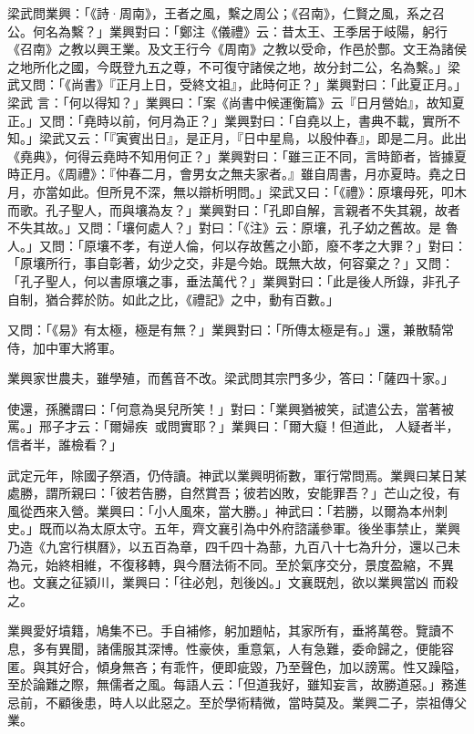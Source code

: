 \begin{pinyinscope}
 梁武問業興：「《詩·周南》，王者之風，繫之周公；《召南》，仁賢之風，系之召公。何名為繫？」業興對曰：「鄭注《儀禮》云：昔太王、王季居于岐陽，躬行《召南》之教以興王業。及文王行今《周南》之教以受命，作邑於酆。文王為諸侯之地所化之國，今既登九五之尊，不可復守諸侯之地，故分封二公，名為繫。」梁武又問：「《尚書》『正月上日，受終文祖』，此時何正？」業興對曰：「此夏正月。」梁武
 言：「何以得知？」業興曰：「案《尚書中候運衡篇》云『日月營始』，故知夏正。」又問：「堯時以前，何月為正？」業興對曰：「自堯以上，書典不載，實所不知。」梁武又云：「『寅賓出日』，是正月，『日中星鳥，以殷仲春』，即是二月。此出《堯典》，何得云堯時不知用何正？」業興對曰：「雖三正不同，言時節者，皆據夏時正月。《周禮》：『仲春二月，會男女之無夫家者。』雖自周書，月亦夏時。堯之日月，亦當如此。但所見不深，無以辯析明問。」梁武又曰：「《禮》：原壤母死，叩木而歌。孔子聖人，而與壤為友？」業興對曰：「孔即自解，言親者不失其親，故者不失其故。」又問：「壤何處人？」對曰：「《注》云：原壤，孔子幼之舊故。是
 魯人。」又問：「原壤不孝，有逆人倫，何以存故舊之小節，廢不孝之大罪？」對曰：「原壤所行，事自彰著，幼少之交，非是今始。既無大故，何容棄之？」又問：「孔子聖人，何以書原壤之事，垂法萬代？」業興對曰：「此是後人所錄，非孔子自制，猶合葬於防。如此之比，《禮記》之中，動有百數。」



 又問：「《易》有太極，極是有無？」業興對曰：「所傳太極是有。」還，兼散騎常侍，加中軍大將軍。



 業興家世農夫，雖學殖，而舊音不改。梁武問其宗門多少，答曰：「薩四十家。」



 使還，孫騰謂曰：「何意為吳兒所笑！」對曰：「業興猶被笑，試遣公去，當著被罵。」邢子才云：「爾婦疾，或問實耶？」業興曰：「爾大癡！但道此，
 人疑者半，信者半，誰檢看？」



 武定元年，除國子祭酒，仍侍讀。神武以業興明術數，軍行常問焉。業興曰某日某處勝，謂所親曰：「彼若告勝，自然賞吾；彼若凶敗，安能罪吾？」芒山之役，有風從西來入營。業興曰：「小人風來，當大勝。」神武曰：「若勝，以爾為本州刺史。」既而以為太原太守。五年，齊文襄引為中外府諮議參軍。後坐事禁止，業興乃造《九宮行棋曆》，以五百為章，四千四十為蔀，九百八十七為升分，還以己未為元，始終相維，不復移轉，與今曆法術不同。至於氣序交分，景度盈縮，不異也。文襄之征潁川，業興曰：「往必剋，剋後凶。」文襄既剋，欲以業興當凶
 而殺之。



 業興愛好墳籍，鳩集不已。手自補修，躬加題帖，其家所有，垂將萬卷。覽讀不息，多有異聞，諸儒服其深博。性豪俠，重意氣，人有急難，委命歸之，便能容匿。與其好合，傾身無吝；有乖忤，便即疵毀，乃至聲色，加以謗罵。性又躁隘，至於論難之際，無儒者之風。每語人云：「但道我好，雖知妄言，故勝道惡。」務進忌前，不顧後患，時人以此惡之。至於學術精微，當時莫及。業興二子，崇祖傳父業。




\end{pinyinscope}
